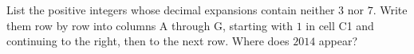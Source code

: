 List the positive integers whose decimal expansions contain neither $3$ nor $7$. Write them row by row into columns A through G, starting with $1$ in cell C1 and continuing to the right, then to the next row. Where does $2014$ appear?
